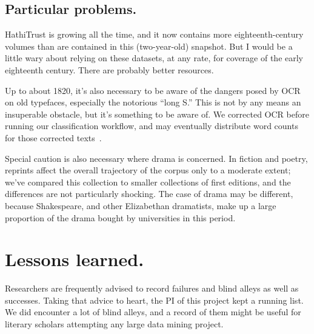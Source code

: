 \documentclass[paper=a4, fontsize=12pt]{scrartcl}
\numberwithin{equation}{section}		%
\numberwithin{figure}{section}			%
\numberwithin{table}{section}				%
\begin{document}
\subsection{Particular problems.}
HathiTrust is growing all the time, and it now contains more eighteenth-century volumes than are contained in this (two-year-old) snapshot. But I would be a little wary about relying on these datasets, at any rate, for coverage of the early eighteenth century. There are probably better resources.

Up to about 1820, it's also necessary to be aware of the dangers posed by OCR on old typefaces, especially the notorious ``long S.'' This is not by any means an insuperable obstacle, but it's something to be aware of. We corrected OCR before running our classification workflow, and may eventually distribute word counts for those corrected texts~\cite{underwood:decent}.

Special caution is also necessary where drama is concerned. In fiction and poetry, reprints affect the overall trajectory of the corpus only to a moderate extent; we've compared this collection to smaller collections of first editions, and the differences are not particularly shocking. The case of drama may be different, because Shakespeare, and other Elizabethan dramatists, make up a large proportion of the drama bought by universities in this period.

\section{Lessons learned.}

Researchers are frequently advised to record failures and blind alleys as well as successes. Taking that advice to heart, the PI of this project kept a running list. We did encounter a lot of blind alleys, and a record of them might be useful for literary scholars attempting any large data mining project.
\end{document}
